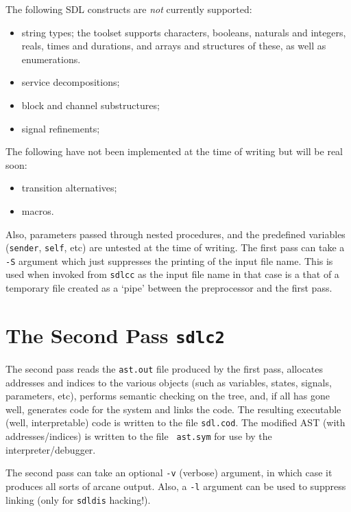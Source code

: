 The following SDL constructs are {\em not} currently supported:

\begin{itemize}
\item string types; the toolset supports characters,
booleans, naturals and integers, reals, times and durations,
and arrays and structures of these, as well as enumerations.
\item service decompositions;
\item block and channel substructures;
\item signal refinements;
\end{itemize}

The following have not been implemented at the time of writing
but will be real soon:

\begin{itemize}
\item transition alternatives;
\item macros.
\end{itemize}

Also, parameters passed through nested procedures, and the predefined
variables ({\tt sender}, {\tt self}, etc) are untested at the time
of writing.
The first pass can take a {\tt -S} argument which just suppresses
the printing of the input file name. This is used when invoked
from {\tt sdlcc} as the input file name in that case is a that 
of a temporary file created as a `pipe' between the preprocessor
and the first pass.

\section{The Second Pass {\tt sdlc2}}

The second pass reads the {\tt ast.out} file produced by the first
pass, allocates addresses and indices to the various objects 
(such as variables, states, signals, parameters, etc), performs 
semantic checking on the tree, and, if all has gone well, generates
code for the system and links the code. The resulting executable
(well, interpretable) code is written to the file {\tt sdl.cod}. The
modified AST (with addresses/indices) is written to the file {\tt
ast.sym} for use by the interpreter/debugger.
 
The second pass can take an optional {\tt -v} (verbose) argument, in
which case it produces all sorts of arcane output. Also, a {\tt -l}
argument can be used to suppress linking (only for {\tt sdldis} 
hacking!).

